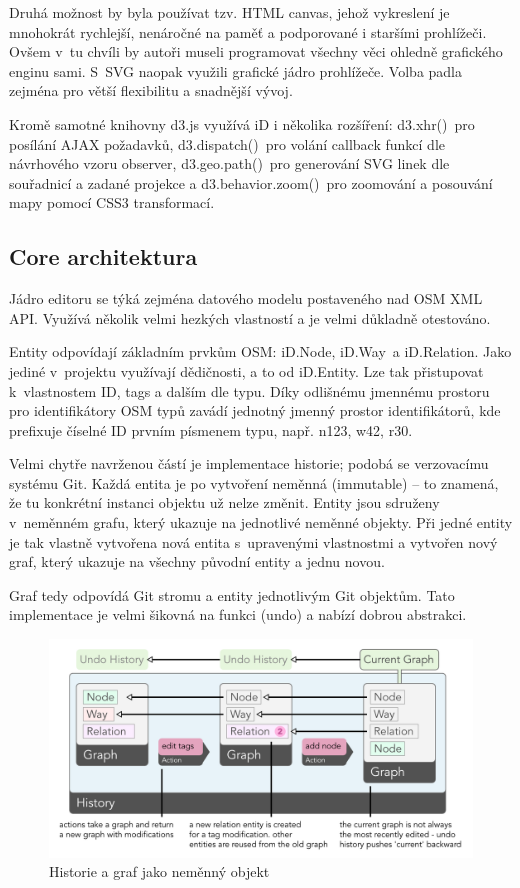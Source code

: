 Druhá možnost by byla používat tzv. HTML canvas, jehož vykreslení je mnohokrát rychlejší, nenáročné na paměť a podporované i staršími prohlížeči. Ovšem v~tu chvíli by autoři museli programovat všechny věci ohledně grafického enginu sami. S~SVG naopak využili grafické jádro prohlížeče. Volba padla zejména pro větší flexibilitu a snadnější vývoj.

Kromě samotné knihovny d3.js využívá iD i několika rozšíření: d3.xhr()~pro posílání AJAX požadavků, d3.dispatch()~pro volání callback funkcí dle návrhového vzoru observer\cite{zdroj54}, d3.geo.path()~pro generování SVG linek dle souřadnicí a zadané projekce a d3.behavior.zoom()~pro zoomování a posouvání mapy pomocí CSS3 transformací.

\subsection{Core architektura}\label{core-architektura-1}

Jádro editoru se týká zejména datového modelu postaveného nad OSM XML API. Využívá několik velmi hezkých vlastností a je velmi důkladně otestováno.

Entity odpovídají základním prvkům OSM: iD.Node, iD.Way~a iD.Relation. Jako jediné v~projektu využívají dědičnosti, a to od iD.Entity. Lze tak přistupovat k~vlastnostem ID, tags a dalším dle typu. Díky odlišnému jmennému prostoru pro identifikátory OSM typů zavádí jednotný jmenný prostor identifikátorů, kde prefixuje číselné ID prvním písmenem typu, např. n123, w42, r30.

Velmi chytře navrženou částí je implementace historie; podobá se verzovacímu systému Git. Každá entita je po vytvoření neměnná (immutable) -- to znamená, že tu konkrétní instanci objektu už nelze změnit. Entity jsou sdruženy v~neměnném grafu, který ukazuje na jednotlivé neměnné objekty. Při  jedné entity je tak vlastně vytvořena nová entita s~upravenými vlastnostmi a vytvořen nový graf, který ukazuje na všechny původní entity a jednu novou.

Graf tedy odpovídá Git stromu a entity jednotlivým Git objektům. Tato implementace je velmi šikovná na funkci  (undo) a nabízí dobrou abstrakci.

 \begin{figure}
	  \centering
      \includegraphics[width=\textwidth]{img/31-id-graph.png}
      \caption{Historie a graf jako neměnný objekt\cite{zdroj53}}
      \label{obr31}
  \end{figure}

